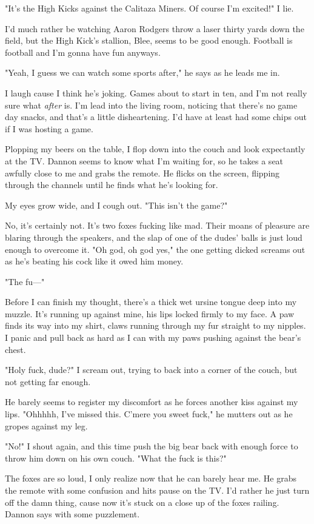 "It's the High Kicks against the Calitaza Miners. Of course I'm excited!" I lie.

I'd much rather be watching Aaron Rodgers throw a laser thirty yards down the field, but the High Kick's stallion, Blee, seems to be good enough. Football is football and I'm gonna have fun anyways.

"Yeah, I guess we can watch some sports after," he says as he leads me in.

I laugh cause I think he's joking. Games about to start in ten, and I'm not really sure what \emph{after} is. I'm lead into the living room, noticing that there's no game day snacks, and that's a little disheartening. I'd have at least had some chips out if I was hosting a game.

Plopping my beers on the table, I flop down into the couch and look expectantly at the TV. Dannon seems to know what I'm waiting for, so he takes a seat awfully close to me and grabs the remote. He flicks on the screen, flipping through the channels until he finds what he's looking for.

My eyes grow wide, and I cough out. "This isn't the game?"

No, it's certainly not. It's two foxes fucking like mad. Their moans of pleasure are blaring through the speakers, and the slap of one of the dudes' balls is just loud enough to overcome it. "Oh god, oh god yes," the one getting dicked screams out as he's beating his cock like it owed him money.

"The fu---"

Before I can finish my thought, there's a thick wet ursine tongue deep into my muzzle. It's running up against mine, his lips locked firmly to my face. A paw finds its way into my shirt, claws running through my fur straight to my nipples. I panic and pull back as hard as I can with my paws pushing against the bear's chest.

"Holy fuck, dude?" I scream out, trying to back into a corner of the couch, but not getting far enough.

He barely seems to register my discomfort as he forces another kiss against my lips. "Ohhhhh, I've missed this. C'mere you sweet fuck," he mutters out as he gropes against my leg.

"No!" I shout again, and this time push the big bear back with enough force to throw him down on his own couch. "What the fuck is this?"

The foxes are so loud, I only realize now that he can barely hear me. He grabs the remote with some confusion and hits pause on the TV. I'd rather he just turn off the damn thing, cause now it's stuck on a close up of the foxes railing. Dannon says with some puzzlement.

